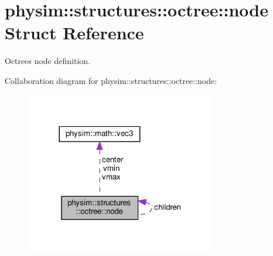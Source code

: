 \hypertarget{structphysim_1_1structures_1_1octree_1_1node}{}\section{physim\+:\+:structures\+:\+:octree\+:\+:node Struct Reference}
\label{structphysim_1_1structures_1_1octree_1_1node}


Octree\textquotesingle{}s node definition.  




Collaboration diagram for physim\+:\+:structures\+:\+:octree\+:\+:node\+:\nopagebreak
\begin{figure}[H]
\begin{center}
\leavevmode
\includegraphics[width=236pt]{structphysim_1_1structures_1_1octree_1_1node__coll__graph}
\end{center}
\end{figure}
